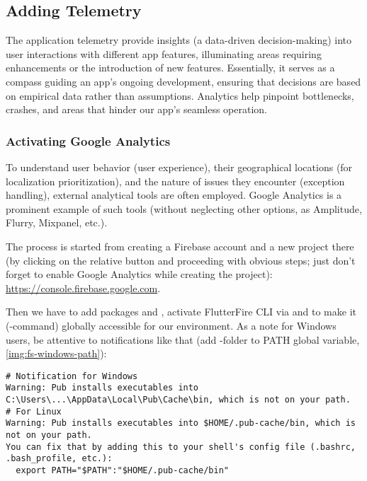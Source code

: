 
\subsection{Adding Telemetry} \label{telemetry}

The application telemetry provide insights (a data-driven decision-making) into user interactions with different app 
features, illuminating areas requiring enhancements or the introduction of new features. Essentially, it serves as a 
compass guiding an app's ongoing development, ensuring that decisions are based on empirical data rather than 
assumptions. Analytics help pinpoint bottlenecks, crashes, and areas that hinder our app's seamless operation. 


\subsubsection{Activating Google Analytics}

To understand user behavior (user experience), their geographical locations (for localization prioritization), and the 
nature of issues they encounter (exception handling), external analytical tools are often employed. Google Analytics 
is a prominent example of such tools (without neglecting other options, as Amplitude, Flurry, Mixpanel, etc.).

The process is started from creating a Firebase account and a new project there (by clicking on the relative 
button and proceeding with obvious steps; just don't forget to enable Google Analytics while creating the project): 
\href{https://console.firebase.google.com}{https://console.firebase.google.com}.

Then we have to add packages  and , activate 
FlutterFire CLI  via  and  to make it 
(-command) globally accessible for our environment. As a note for Windows users, be attentive to 
notifications like that (add -folder to PATH global variable, \cref{img:fs-windows-path}):

\begin{lstlisting}[language=terminal]
# Notification for Windows
Warning: Pub installs executables into C:\Users\...\AppData\Local\Pub\Cache\bin, which is not on your path.
# For Linux
Warning: Pub installs executables into $HOME/.pub-cache/bin, which is not on your path.
You can fix that by adding this to your shell's config file (.bashrc, .bash_profile, etc.):
  export PATH="$PATH":"$HOME/.pub-cache/bin"
\end{lstlisting}

